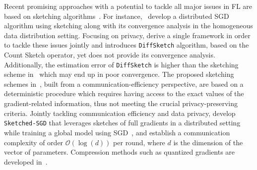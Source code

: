 \documentclass[twoside]{article}
\begin{document}
Recent promising approaches with a potential to tackle all major issues in FL are based on sketching algorithms~\cite{DBLP:journals/tcs/CharikarCF04,cormode2005improved,kleinberg2003bursty,Proc:Li_Church_Hastie_NIPS08}. 
For instance,~\cite{ivkin2019communication} develop a distributed SGD algorithm using sketching along with its convergence analysis in the homogeneous data distribution setting. 
Focusing on privacy, \cite{li2019privacy} derive a single framework in order to tackle these issues jointly and introduces \texttt{DiffSketch} algorithm, based on the Count Sketch operator, yet does not provide its convergence analysis.
Additionally, the estimation error of \texttt{DiffSketch} is higher than the sketching scheme in~\cite{ivkin2019communication} which may end up in poor convergence. 
The proposed sketching schemes in~\cite{ivkin2019communication,rothchild2020fetchsgd}, built from a communication-efficiency perspective, are based on a deterministic procedure which requires having access to the exact values of the gradient-related information, thus not meeting the crucial privacy-preserving criteria.   
Jointly tackling communication efficiency and data privacy, \cite{ivkin2019communication} develop \texttt{Sketched-SGD} that leverages sketches of full gradients in a distributed setting while training a global model using SGD~\cite{robbins1951stochastic, bottou-bousquet-2008}, and establish a communication complexity of order $\mathcal{O}(\log(d))$ per round, where $d$ is the dimension of the vector of parameters.
Compression methods such as quantized gradients are developed in~\cite{alistarh2017qsgd,lin2017deep,stich2018sparsified,horvath2019stochastic,horvath2020better}. 

 
\end{document}
